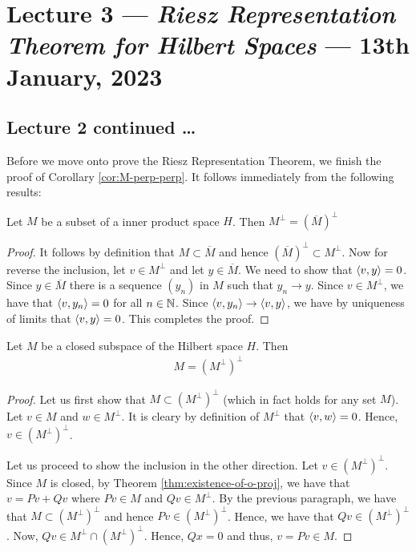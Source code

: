 \section{Lecture 3 --- \textit{Riesz Representation Theorem for Hilbert Spaces} --- 13th January, 2023}

\subsection{Lecture 2 continued \ldots}
Before we move onto prove the Riesz Representation Theorem, we finish the proof of Corollary \ref{cor:M-perp-perp}. It follows immediately from the following results:

\begin{proposition}
    Let $M$ be a subset of a inner product space $H$. Then $M^{\perp} =  \left( \overline{M} \right)^{\perp}$
    \label{prop:perp-and-closure-perp}
\end{proposition}
\begin{proof}
    It follows by definition that $M \subset \overline M$ and hence $\left( \overline M \right)^{\perp} \subset M^{\perp}$. Now for reverse the inclusion, let $v \in M^{\perp}$ and let $y \in \overline M$. We need to show that $\left\langle v,y \right\rangle = 0$. Since $y\in \overline M$ there is a sequence $\left( y_{n} \right)$ in $M$ such that $y_{n} \to y$. Since $v \in M^{\perp}$, we have that $\left\langle v , y_{n} \right\rangle=0 $ for all $n\in \mathbb N$. Since $\left\langle v, y_{n} \right\rangle \to \left\langle v,y \right\rangle$, we have by uniqueness of limits that $\left\langle v,y \right\rangle = 0$. This completes the proof.
\end{proof}

\begin{proposition}
    Let $M$ be a closed subspace of the Hilbert space $H$. Then 
    \begin{align*}
	M = \left( M^{\perp} \right) ^{\perp}
    \end{align*}
    \label{prop:o-comp-of-o-comp}
\end{proposition}
\begin{proof}
    Let us first show that $M \subset \left( M ^{\perp} \right)^{\perp}$ (which in fact holds for any set $M$). Let $v \in M$ and $w \in M^{\perp}$. It is cleary by definition of $M^{\perp}$ that $\left\langle v,w \right\rangle = 0$. Hence, $v \in \left( M^{\perp} \right)^{\perp}$.

    Let us proceed to show the inclusion in the other direction. Let $v \in \left( M^{\perp} \right)^{\perp}$. Since $M$ is closed, by Theorem \ref{thm:existence-of-o-proj}, we have that $v = Pv + Qv$ where $Pv \in M$ and $Qv \in M^{\perp}$. By the previous paragraph, we have that $M \subset \left( M^{\perp} \right)^{\perp}$ and hence $Pv \in \left( M^{\perp} \right) ^{\perp}$. Hence, we have that $Qv \in \left( M^{\perp} \right)^{\perp}$. Now, $Qv \in M^{\perp} \cap \left( M^{\perp} \right) ^{\perp}$. Hence, $Qx = 0$ and thus, $v=Pv \in M$.
\end{proof}

